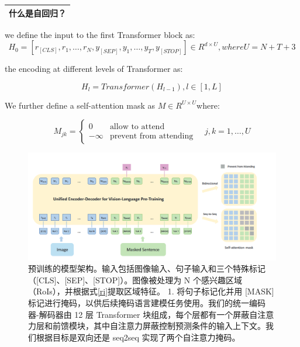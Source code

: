 \documentclass{article}
\begin{document}
\begin{sloppypar}
\begin{table}[!htbp]
            \centering
            \begin{tabularx}{\textwidth}{|X|}
                  \hline
                  什么是自回归？
                  \\
                  \hline
            \end{tabularx}%

      \end{table}%

      we define the input to the first Transformer block as:
      \begin{equation}
            H_0 = [r_{[CLS]}, r_1, \dots, r_N, y_{[SEP]}, y_1, \dots, y_T, y_{[STOP]}] \in R^{d \times U},where U=N+T+3
            \label{auto-regressive}
      \end{equation}

      the encoding at different levels of Transformer as:

      \begin{equation}
            H_l = Transformer(H_{l - 1}),l \in [1,L]
            \label{recur}
      \end{equation}


      We further define a self-attention mask as $M \in R^{U \times U}$where:

      \begin{equation}
            M_{jk} =
            \begin{cases}
                  0       & \text{allow to attend}        \\
                  -\infty & \text{prevent from attending}
            \end{cases}
            \quad j,k=1, \ldots, U
            \label{masked}
      \end{equation}

      \newpage

      \begin{figure}[h]
            \includegraphics[scale=0.5]{image}
            \caption{预训练的模型架构。输入包括图像输入、句子输入和三个特殊标记（[CLS]、[SEP]、[STOP]）。图像被处理为 N 个感兴趣区域（RoIs），并根据式\ref{ri}提取区域特征。 1. 将句子标记化并用 [MASK] 标记进行掩码，以供后续掩码语言建模任务使用。我们的统一编码器-解码器由 12 层 Transformer 块组成，每个层都有一个屏蔽自注意力层和前馈模块，其中自注意力屏蔽控制预测条件的输入上下文。我们根据目标是双向还是 seq2seq 实现了两个自注意力掩码。}
            \label{procedure}
      \end{figure}



\end{sloppypar}
\end{document}
